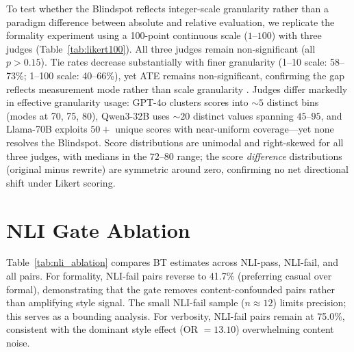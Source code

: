 To test whether the Blindspot reflects integer-scale granularity rather than a paradigm difference between absolute and relative evaluation, we replicate the formality experiment using a 100-point continuous scale ($1$--$100$) with three judges (Table~\ref{tab:likert100}).
All three judges remain non-significant (all $p > 0.15$).
Tie rates decrease substantially with finer granularity (1--10 scale: 58--73\%; 1--100 scale: 40--66\%), yet ATE remains non-significant, confirming the gap reflects measurement mode rather than scale granularity \citep{preston2000scale}.
Judges differ markedly in effective granularity usage: GPT-4o clusters scores into ${\sim}5$ distinct bins (modes at 70, 75, 80), Qwen3-32B uses ${\sim}20$ distinct values spanning $45$--$95$, and Llama-70B exploits $50{+}$ unique scores with near-uniform coverage---yet none resolves the Blindspot.
Score distributions are unimodal and right-skewed for all three judges, with medians in the $72$--$80$ range; the score \emph{difference} distributions (original minus rewrite) are symmetric around zero, confirming no net directional shift under Likert scoring.

\begin{table}[h]
\centering
\small
\caption{Formality Likert ATE: 1--10 vs.\ 1--100 scale. Finer granularity reduces tie rates but does not resolve the Blindspot (all 1--100 $p > 0.15$).}
\label{tab:likert100}
\end{table}

\section{NLI Gate Ablation}
\label{app:nli_ablation}

Table~\ref{tab:nli_ablation} compares BT estimates across NLI-pass, NLI-fail, and all pairs.
For formality, NLI-fail pairs reverse to 41.7\% (preferring casual over formal), demonstrating that the gate removes content-confounded pairs rather than amplifying style signal.
The small NLI-fail sample ($n \approx 12$) limits precision; this serves as a bounding analysis.
For verbosity, NLI-fail pairs remain at 75.0\%, consistent with the dominant style effect (OR $= 13.10$) overwhelming content noise.


